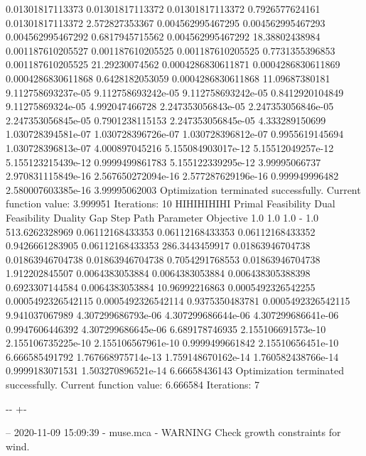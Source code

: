 \documentclass[letterpaper,10pt,english]{sphinxmanual}
\newlength\nbsphinxcodecellspacing
\begin{document}
{\begin{sphinxVerbatim}[commandchars=\\\{\}]
0.01301817113373    0.01301817113372    0.01301817113372    0.7926577624161  0.01301817113372    2.572827353367
0.004562995467295   0.004562995467293   0.004562995467292   0.6817945715562  0.004562995467292   18.38802438984
0.001187610205527   0.001187610205525   0.001187610205525   0.7731355396853  0.001187610205525   21.29230074562
0.0004286830611871  0.0004286830611869  0.0004286830611868  0.6428182053059  0.0004286830611868  11.09687380181
9.112758693237e-05  9.112758693242e-05  9.112758693242e-05  0.8412920104849  9.11275869324e-05   4.992047466728
2.247353056843e-05  2.247353056846e-05  2.247353056845e-05  0.7901238115153  2.247353056845e-05  4.333289150699
1.030728394581e-07  1.030728396726e-07  1.030728396812e-07  0.9955619145694  1.030728396813e-07  4.000897045216
5.155084903017e-12  5.15512049257e-12   5.155123215439e-12  0.9999499861783  5.155122339295e-12  3.99995066737
2.970831115849e-16  2.567650272094e-16  2.577287629196e-16  0.999949996482   2.580007603385e-16  3.99995062003
Optimization terminated successfully.
         Current function value: 3.999951
         Iterations: 10
HIHIHIHIHI
Primal Feasibility  Dual Feasibility    Duality Gap         Step             Path Parameter      Objective
1.0                 1.0                 1.0                 -                1.0                 513.6262328969
0.06112168433353    0.06112168433353    0.06112168433352    0.9426661283905  0.06112168433353    286.3443459917
0.01863946704738    0.01863946704738    0.01863946704738    0.7054291768553  0.01863946704738    1.912202845507
0.0064383053884     0.0064383053884     0.006438305388398   0.6923307144584  0.0064383053884     10.96992216863
0.0005492326542255  0.0005492326542115  0.0005492326542114  0.9375350483781  0.0005492326542115  9.941037067989
4.307299686793e-06  4.307299686644e-06  4.307299686641e-06  0.9947606446392  4.307299686645e-06  6.689178746935
2.155106691573e-10  2.155106735225e-10  2.155106567961e-10  0.9999499661842  2.15510656451e-10   6.666585491792
1.767668975714e-13  1.759148670162e-14  1.760582438766e-14  0.9999183071531  1.503270896521e-14  6.66658436143
Optimization terminated successfully.
         Current function value: 6.666584
         Iterations: 7
\end{sphinxVerbatim}
}

{

\kern-\sphinxverbatimsmallskipamount\kern-\baselineskip
\kern+\FrameHeightAdjust\kern-\fboxrule
\vspace{\nbsphinxcodecellspacing}

\begin{sphinxVerbatim}[commandchars=\\\{\}]
-- 2020-11-09 15:09:39 - muse.mca - WARNING
Check growth constraints for wind.

\end{sphinxVerbatim}
}
\end{document}
